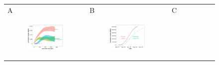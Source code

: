 \documentclass[11pt]{article}
\begin{document}
\begin{figure}[ht]
	\begin{tabular}{lll}
	A&B&C\\
	\begin{subfigure}[t]{0.3\linewidth}
		\centering
		\includegraphics[width=1\linewidth]{figs/figure-2a-excess-deaths-pr.pdf} 
	\end{subfigure}&
	\begin{subfigure}[t]{0.3\linewidth}
		\centering
		\includegraphics[width=1\linewidth]{figs/figure-2b-excess-deaths-us.pdf}
	\end{subfigure}&
	\begin{subfigure}[t]{0.3\linewidth}
		\centering

\end{subfigure}
\end{tabular}
\end{figure}
\end{document}
